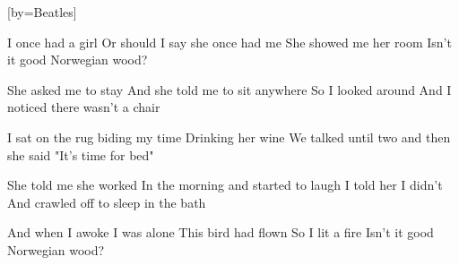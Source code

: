 

[by=Beatles]

\begin{LARGE}


\beginverse
I once had a girl
Or should I say she once had me
She showed me her room
Isn't it good Norwegian wood?
\endverse

\beginverse
She asked me to stay
And she told me to sit anywhere
So I looked around
And I noticed there wasn't a chair
\endverse

\beginverse
I sat on the rug biding my time
Drinking her wine
We talked until two and then she said
"It's time for bed"
\endverse

\beginverse
She told me she worked
In the morning and started to laugh
I told her I didn't
And crawled off to sleep in the bath
\endverse

\beginverse
And when I awoke I was alone
This bird had flown
So I lit a fire
Isn't it good Norwegian wood?
\endverse


\end{LARGE}


\chordson
\endsong
